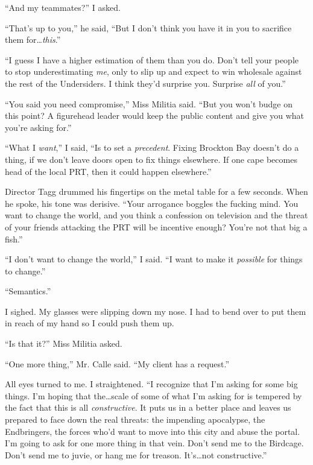 ``And my teammates?'' I asked.



``That's up to you,'' he said, ``But I don't think you have it in you to sacrifice them for\ldots \emph{this}.''



``I guess I have a higher estimation of them than you do.  Don't tell your people to stop underestimating \emph{me}, only to slip up and expect to win wholesale against the rest of the Undersiders.  I think they'd surprise you.  Surprise \emph{all} of you.''



``You said you need compromise,'' Miss Militia said.  ``But you won't budge on this point?  A figurehead leader would keep the public content and give you what you're asking for.''



``What I \emph{want},'' I said, ``Is to set a \emph{precedent}.  Fixing Brockton Bay doesn't do a thing, if we don't leave doors open to fix things elsewhere.  If one cape becomes head of the local PRT, then it could happen elsewhere.''



Director Tagg drummed his fingertips on the metal table for a few seconds.  When he spoke, his tone was derisive.  ``Your arrogance boggles the fucking mind.  You want to change the world, and you think a confession on television and the threat of your friends attacking the PRT will be incentive enough?  You're not that big a fish.''



``I don't want to change the world,'' I said.  ``I want to make it \emph{possible} for things to change.''



``Semantics.''



I sighed.  My glasses were slipping down my nose.  I had to bend over to put them in reach of my hand so I could push them up.



``Is that it?'' Miss Militia asked.



``One more thing,'' Mr. Calle said.  ``My client has a request.''



All eyes turned to me.  I straightened.  ``I recognize that I'm asking for some big things.  I'm hoping that the\ldots scale of some of what I'm asking for is tempered by the fact that this is all \emph{constructive}.  It puts us in a better place and leaves us prepared to face down the real threats: the impending apocalypse, the Endbringers, the forces who'd want to move into this city and abuse the portal.  I'm going to ask for one more thing in that vein.  Don't send me to the Birdcage.  Don't send me to juvie, or hang me for treason.  It's\ldots not constructive.''



